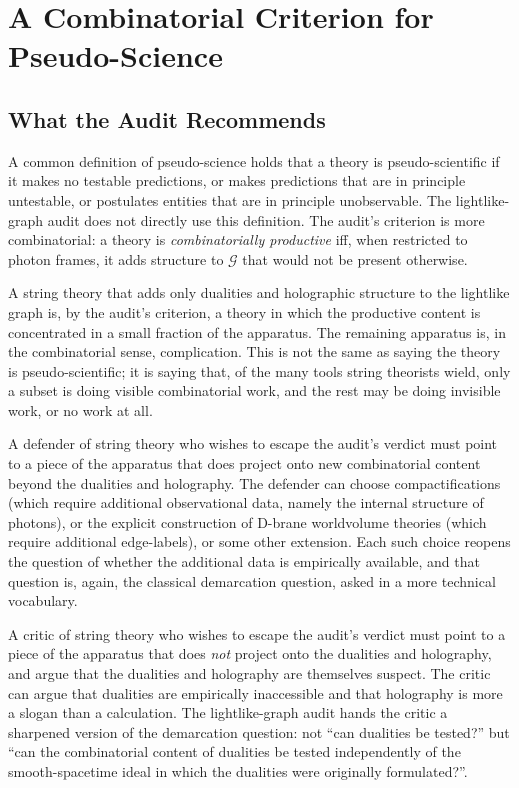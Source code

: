 \documentclass[11pt]{article}
\begin{document}
\section{A Combinatorial Criterion for Pseudo-Science}

\subsection{What the Audit Recommends}

A common definition of pseudo-science holds that a theory is pseudo-scientific if it makes no testable predictions, or makes predictions that are in principle untestable, or postulates entities that are in principle unobservable. The lightlike-graph audit does not directly use this definition. The audit's criterion is more combinatorial: a theory is \emph{combinatorially productive} iff, when restricted to photon frames, it adds structure to $\mathcal{G}$ that would not be present otherwise.

A string theory that adds only dualities and holographic structure to the lightlike graph is, by the audit's criterion, a theory in which the productive content is concentrated in a small fraction of the apparatus. The remaining apparatus is, in the combinatorial sense, complication. This is not the same as saying the theory is pseudo-scientific; it is saying that, of the many tools string theorists wield, only a subset is doing visible combinatorial work, and the rest may be doing invisible work, or no work at all.

A defender of string theory who wishes to escape the audit's verdict must point to a piece of the apparatus that does project onto new combinatorial content beyond the dualities and holography. The defender can choose compactifications (which require additional observational data, namely the internal structure of photons), or the explicit construction of D-brane worldvolume theories (which require additional edge-labels), or some other extension. Each such choice reopens the question of whether the additional data is empirically available, and that question is, again, the classical demarcation question, asked in a more technical vocabulary.

A critic of string theory who wishes to escape the audit's verdict must point to a piece of the apparatus that does \emph{not} project onto the dualities and holography, and argue that the dualities and holography are themselves suspect. The critic can argue that dualities are empirically inaccessible and that holography is more a slogan than a calculation. The lightlike-graph audit hands the critic a sharpened version of the demarcation question: not ``can dualities be tested?'' but ``can the combinatorial content of dualities be tested independently of the smooth-spacetime ideal in which the dualities were originally formulated?''.
\end{document}
